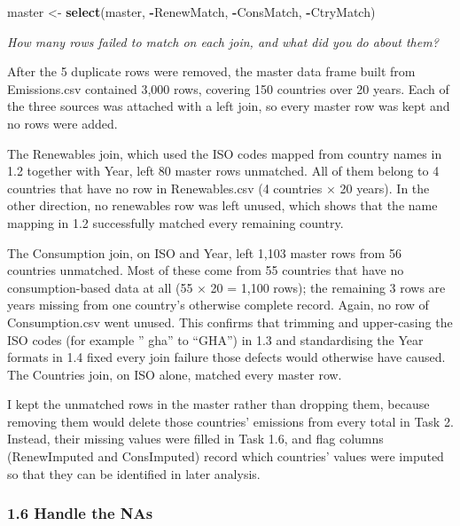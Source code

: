 \documentclass[
]{article}
\newenvironment{Shaded}{\begin{snugshade}}{\end{snugshade}}
\newcommand{\FunctionTok}[1]{\textcolor[rgb]{0.13,0.29,0.53}{\textbf{#1}}}
\newcommand{\NormalTok}[1]{#1}
\newcommand{\OtherTok}[1]{\textcolor[rgb]{0.56,0.35,0.01}{#1}}
\newcommand{\SpecialCharTok}[1]{\textcolor[rgb]{0.81,0.36,0.00}{\textbf{#1}}}
\begin{document}
\begin{Shaded}
\begin{Highlighting}[]
\NormalTok{master }\OtherTok{\textless{}{-}} \FunctionTok{select}\NormalTok{(master, }\SpecialCharTok{{-}}\NormalTok{RenewMatch, }\SpecialCharTok{{-}}\NormalTok{ConsMatch, }\SpecialCharTok{{-}}\NormalTok{CtryMatch)}
\end{Highlighting}
\end{Shaded}

\emph{How many rows failed to match on each join, and what did you do
about them?}

After the 5 duplicate rows were removed, the master data frame built
from Emissions.csv contained 3,000 rows, covering 150 countries over 20
years. Each of the three sources was attached with a left join, so every
master row was kept and no rows were added.

The Renewables join, which used the ISO codes mapped from country names
in 1.2 together with Year, left 80 master rows unmatched. All of them
belong to 4 countries that have no row in Renewables.csv (4 countries ×
20 years). In the other direction, no renewables row was left unused,
which shows that the name mapping in 1.2 successfully matched every
remaining country.

The Consumption join, on ISO and Year, left 1,103 master rows from 56
countries unmatched. Most of these come from 55 countries that have no
consumption-based data at all (55 × 20 = 1,100 rows); the remaining 3
rows are years missing from one country's otherwise complete record.
Again, no row of Consumption.csv went unused. This confirms that
trimming and upper-casing the ISO codes (for example '' gha'' to
``GHA'') in 1.3 and standardising the Year formats in 1.4 fixed every
join failure those defects would otherwise have caused. The Countries
join, on ISO alone, matched every master row.

I kept the unmatched rows in the master rather than dropping them,
because removing them would delete those countries' emissions from every
total in Task 2. Instead, their missing values were filled in Task 1.6,
and flag columns (RenewImputed and ConsImputed) record which countries'
values were imputed so that they can be identified in later analysis.

\subsubsection{1.6 Handle the NAs}\label{handle-the-nas}
\end{document}
